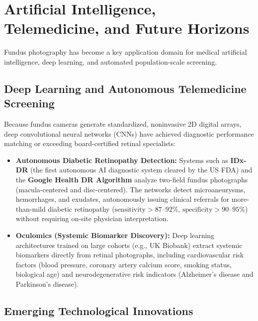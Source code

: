 \documentclass[11pt,a4paper]{article}
\begin{document}
\section{Artificial Intelligence, Telemedicine, and Future Horizons}

Fundus photography has become a key application domain for medical artificial intelligence, deep learning, and automated population-scale screening.

\subsection{Deep Learning and Autonomous Telemedicine Screening}

Because fundus cameras generate standardized, noninvasive 2D digital arrays, deep convolutional neural networks (CNNs) have achieved diagnostic performance matching or exceeding board-certified retinal specialists:
\begin{itemize}[leftmargin=*]
    \item \textbf{Autonomous Diabetic Retinopathy Detection:} Systems such as \textbf{IDx-DR} (the first autonomous AI diagnostic system cleared by the US FDA) and the \textbf{Google Health DR Algorithm} analyze two-field fundus photographs (macula-centered and disc-centered). The networks detect microaneurysms, hemorrhages, and exudates, autonomously issuing clinical referrals for more-than-mild diabetic retinopathy ($\text{sensitivity} > 87\text{--}92\%$, $\text{specificity} > 90\text{--}95\%$) without requiring on-site physician interpretation.
    \item \textbf{Oculomics (Systemic Biomarker Discovery):} Deep learning architectures trained on large cohorts (e.g., UK Biobank) extract systemic biomarkers directly from retinal photographs, including cardiovascular risk factors (blood pressure, coronary artery calcium score, smoking status, biological age) and neurodegenerative risk indicators (Alzheimer's disease and Parkinson's disease).
\end{itemize}

\subsection{Emerging Technological Innovations}
\end{document}
